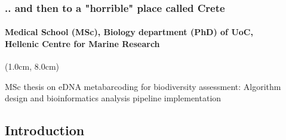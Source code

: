 \documentclass{beamer}
\begin{document}
   \begin{frame}

      \frametitle{.. and then to a "horrible" place called Crete}
      \framesubtitle{
         Medical School (MSc), Biology department (PhD) of UoC, \\
         Hellenic Centre for Marine Research
         }


      \begin{textblock*}{10cm}(1.0cm, 8.0cm)

         \small MSc thesis on eDNA metabarcoding for biodiversity assessment: 
         Algorithm design and bioinformatics analysis pipeline implementation
         
      \end{textblock*}


   \end{frame}
   \fi


   \begin{darkframes}
      \section{
         Introduction
      }
   \end{darkframes}
\end{document}
